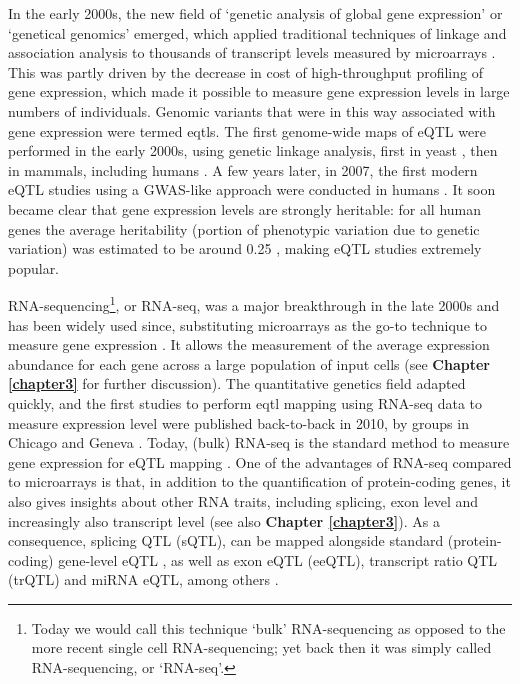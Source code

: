 In the early 2000s, the new field of `genetic analysis of global gene expression' or `genetical genomics' \cite{jansen2001genetical} emerged, which applied traditional techniques of linkage and association analysis to thousands of transcript levels measured by microarrays \cite{rockman2006genetics}.
This was partly driven by the decrease in cost of high-throughput profiling of gene expression, which made it possible to measure gene expression levels in large numbers of individuals.
Genomic variants that were in this way associated with gene expression were termed \glspl{eqtl}. 
The first genome-wide maps of eQTL were performed in the early 2000s, using genetic linkage analysis, first in yeast \cite{brem2002genetic}, then in mammals, including humans \cite{schadt2003genetics}. 
A few years later, in 2007, the first modern eQTL studies using a GWAS-like approach were conducted in humans \cite{stranger2007population, dixon2007genome}. 
It soon became clear that gene expression levels are strongly heritable: for all human genes the average heritability (portion of phenotypic variation due to genetic variation) was estimated to be around 0.25 \cite{ricano2013mapping, dunham2012integrated, maurano2012systematic, westra2014genome}, making eQTL studies extremely popular.

RNA-sequencing\footnote{Today we would call this technique `bulk' RNA-sequencing as opposed to the more recent single cell RNA-sequencing; yet back then it was simply called RNA-sequencing, or `RNA-seq'.}, or RNA-seq, was a major breakthrough in the late 2000s 
and has been widely used since, substituting microarrays as the go-to technique to measure gene expression \cite{weber2015discovering}.
It allows the measurement of the average expression abundance for each gene across a large population 
of input cells (see \textbf{Chapter 
\ref{chapter3}}
for further discussion).
The quantitative genetics field adapted quickly, and the first studies to perform \gls{eqtl} mapping using RNA-seq data to measure expression level were published back-to-back in 2010, by groups in Chicago and Geneva
\cite{montgomery2010transcriptome, pickrell2010understanding}.
Today, (bulk) RNA-seq is the standard method to measure gene expression for eQTL mapping \cite{lappalainen2013transcriptome, gtex2015genotype, chen2016genetic}.
One of the advantages of RNA-seq compared to microarrays is that, in addition to the quantification of protein-coding genes, it also  gives insights about other RNA traits, including splicing, exon level and increasingly also transcript level (see also \textbf{Chapter
\ref{chapter3}}).
As a consequence, splicing QTL (sQTL), can be mapped alongside standard (protein-coding) gene-level eQTL \cite{pickrell2010understanding, montgomery2010transcriptome}, as well as exon eQTL (eeQTL), transcript ratio QTL (trQTL) and miRNA eQTL, among others \cite{lappalainen2013transcriptome, bonder2019systematic}.
 
